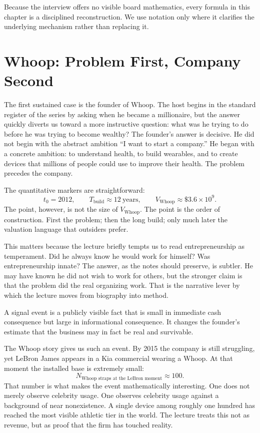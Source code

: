 \begin{remark}
Because the interview offers no visible board mathematics, every formula in this chapter is a disciplined reconstruction. We use notation only where it clarifies the underlying mechanism rather than replacing it.
\end{remark}

\section{Whoop: Problem First, Company Second}

The first sustained case is the founder of Whoop. The host begins in the standard register of the series by asking when he became a millionaire, but the answer quickly diverts us toward a more instructive question: what was he trying to do before he was trying to become wealthy? The founder's answer is decisive. He did not begin with the abstract ambition ``I want to start a company.'' He began with a concrete ambition: to understand health, to build wearables, and to create devices that millions of people could use to improve their health. The problem precedes the company.

The quantitative markers are straightforward:
\begin{equation}
t_0 = 2012,
\qquad
T_{\text{build}} \approx 12\ \text{years},
\qquad
V_{\text{Whoop}} \approx \$3.6 \times 10^9.
\end{equation}
The point, however, is not the size of \(V_{\text{Whoop}}\). The point is the order of construction. First the problem; then the long build; only much later the valuation language that outsiders prefer.

This matters because the lecture briefly tempts us to read entrepreneurship as temperament. Did he always know he would work for himself? Was entrepreneurship innate? The answer, as the notes should preserve, is subtler. He may have known he did not wish to work for others, but the stronger claim is that the problem did the real organizing work. That is the narrative lever by which the lecture moves from biography into method.

\begin{definition}
A signal event is a publicly visible fact that is small in immediate cash consequence but large in informational consequence. It changes the founder's estimate that the business may in fact be real and survivable.
\end{definition}

The Whoop story gives us such an event. By 2015 the company is still struggling, yet LeBron James appears in a Kia commercial wearing a Whoop. At that moment the installed base is extremely small:
\begin{equation}
N_{\text{Whoop straps at the LeBron moment}} \approx 100.
\end{equation}
That number is what makes the event mathematically interesting. One does not merely observe celebrity usage. One observes celebrity usage against a background of near nonexistence. A single device among roughly one hundred has reached the most visible athletic tier in the world. The lecture treats this not as revenue, but as proof that the firm has touched reality.


